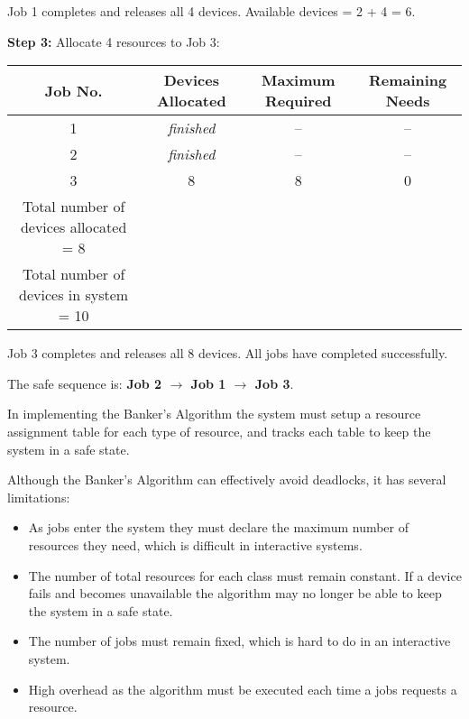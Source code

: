 \documentclass[12pt letter]{report}
\begin{document}
{  Job 1 completes and releases all 4 devices. Available devices = 2 + 4 = 6.

  \textbf{Step 3:} Allocate 4 resources to Job 3:
  \begin{table}[H]
    \begin{center}
      \begin{tabular}{|c c c c|}
        \hline
        Job No. & Devices Allocated & Maximum Required & Remaining
        Needs \\ [0.5ex]
        \hline
        \hline
        1 & \textit{finished} & -- & -- \\
        2 & \textit{finished} & -- & -- \\
        3 & 8 & 8 & 0 \\
        \hline
        Total number of devices allocated = 8 & & & \\
        \hline
        Total number of devices in system = 10 & & & \\
        \hline
      \end{tabular}
    \end{center}
  \end{table}

  Job 3 completes and releases all 8 devices. All jobs have completed
  successfully.

  The safe sequence is: \textbf{Job 2 $\rightarrow$ Job 1 $\rightarrow$ Job 3}.
}

In implementing the Banker's Algorithm the system must setup  a
resource assignment table for each type of resource, and tracks each
table to keep the system in a safe state.

Although the Banker's Algorithm can effectively avoid deadlocks, it
has several limitations:
\begin{itemize}
  \item  As jobs enter the system they must declare the maximum
    number of resources they need, which is difficult in interactive systems.
  \item The number of total resources for each class must remain
    constant. If a device fails and becomes unavailable the algorithm
    may no longer be able to keep the system in a safe state.
  \item The number of jobs must remain fixed, which is hard to do in
    an interactive system.
  \item High overhead as the algorithm must be executed each time a
    jobs requests a resource.
\end{itemize}
\end{document}
